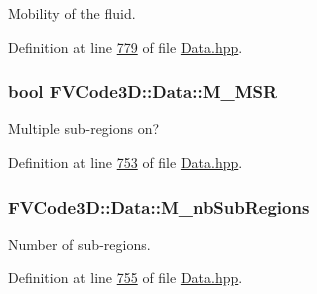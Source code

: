 Mobility of the fluid. 



Definition at line \hyperlink{Data_8hpp_source_l00779}{779} of file \hyperlink{Data_8hpp_source}{Data.\+hpp}.

\subsubsection[{\texorpdfstring{M\+\_\+\+M\+SR}{M_MSR}}]{\setlength{\rightskip}{0pt plus 5cm}bool F\+V\+Code3\+D\+::\+Data\+::\+M\+\_\+\+M\+SR\hspace{0.3cm}{\ttfamily [protected]}}\hypertarget{classFVCode3D_1_1Data_a79a937025567c594d491124fdd7371d1}{}\label{classFVCode3D_1_1Data_a79a937025567c594d491124fdd7371d1}


Multiple sub-\/regions on? 



Definition at line \hyperlink{Data_8hpp_source_l00753}{753} of file \hyperlink{Data_8hpp_source}{Data.\+hpp}.

\subsubsection[{\texorpdfstring{M\+\_\+nb\+Sub\+Regions}{M_nbSubRegions}}]{ F\+V\+Code3\+D\+::\+Data\+::\+M\+\_\+nb\+Sub\+Regions\hspace{0.3cm}{\ttfamily [protected]}}\hypertarget{classFVCode3D_1_1Data_a939f25d917c0fc4cc307727f0161818d}{}\label{classFVCode3D_1_1Data_a939f25d917c0fc4cc307727f0161818d}


Number of sub-\/regions. 



Definition at line \hyperlink{Data_8hpp_source_l00755}{755} of file \hyperlink{Data_8hpp_source}{Data.\+hpp}.

